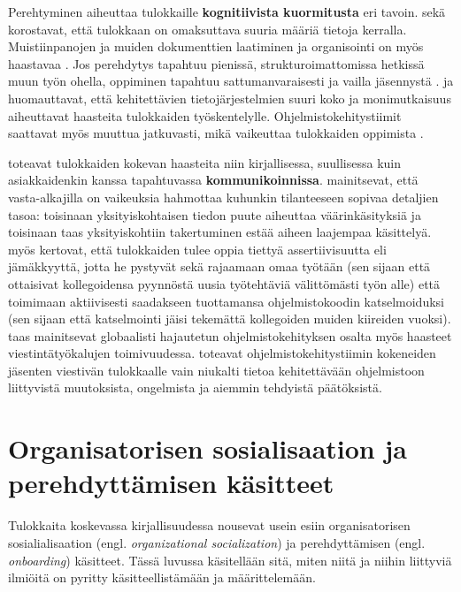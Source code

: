 \documentclass[utf8]{gradu3}
\begin{document}
Perehtyminen aiheuttaa tulokkaille \textbf{kognitiivista kuormitusta} eri tavoin. \textcite{dagenais-ym-2010} sekä \textcite{begel-simon-2008} korostavat, että tulokkaan on omaksuttava suuria määriä tietoja kerralla. Muistiinpanojen ja muiden dokumenttien laatiminen ja organisointi on myös haastavaa \parencite{radermacher-ym-2015}. Jos perehdytys tapahtuu pienissä, strukturoimattomissa hetkissä muun työn ohella, oppiminen tapahtuu sattumanvaraisesti ja vailla jäsennystä \parencite{begel-simon-2008}. \textcite{craig-ym-2018} ja \textcite{britto-ym-2019} huomauttavat, että kehitettävien tietojärjestelmien suuri koko ja monimutkaisuus aiheuttavat haasteita tulokkaiden työskentelylle. Ohjelmistokehitystiimit saattavat myös muuttua jatkuvasti, mikä vaikeuttaa tulokkaiden oppimista \parencite{britto-ym-2019}.

\textcite{radermacher-ym-2015} toteavat tulokkaiden kokevan haasteita niin kirjallisessa, suullisessa kuin asiakkaidenkin kanssa tapahtuvassa \textbf{kommunikoinnissa}. \textcite{begel-simon-2008} mainitsevat, että vasta-alkajilla on vaikeuksia hahmottaa kuhunkin tilanteeseen sopivaa detaljien tasoa: toisinaan yksityiskohtaisen tiedon puute aiheuttaa väärinkäsityksiä ja toisinaan taas yksityiskohtiin takertuminen estää aiheen laajempaa käsittelyä. \textcite{begel-simon-2008} myös kertovat, että tulokkaiden tulee oppia tiettyä assertiivisuutta eli jämäkkyyttä, jotta he pystyvät sekä rajaamaan omaa työtään (sen sijaan että ottaisivat kollegoidensa pyynnöstä uusia työtehtäviä välittömästi työn alle) että toimimaan aktiivisesti saadakseen tuottamansa ohjelmistokoodin katselmoiduksi (sen sijaan että katselmointi jäisi tekemättä kollegoiden muiden kiireiden vuoksi). \textcite{moe-ym-2020} taas mainitsevat globaalisti hajautetun ohjelmistokehityksen osalta myös haasteet viestintätyökalujen toimivuudessa. \textcite{matturro-ym-2017} toteavat ohjelmistokehitystiimin kokeneiden jäsenten viestivän tulokkaalle vain niukalti tietoa kehitettävään ohjelmistoon liittyvistä muutoksista, ongelmista ja aiemmin tehdyistä päätöksistä.



\section{Organisatorisen sosialisaation ja perehdyttämisen käsitteet}
\label{luku-organisatorinen-sosialisaatio-ja-perehdyttäminen}

Tulokkaita koskevassa kirjallisuudessa nousevat usein esiin organisatorisen sosialialisaation (engl. \textit{organizational socialization}) ja perehdyttämisen (engl. \textit{onboarding}) käsitteet. Tässä luvussa käsitellään sitä, miten niitä ja niihin liittyviä ilmiöitä on pyritty käsitteellistämään ja määrittelemään.
\end{document}
